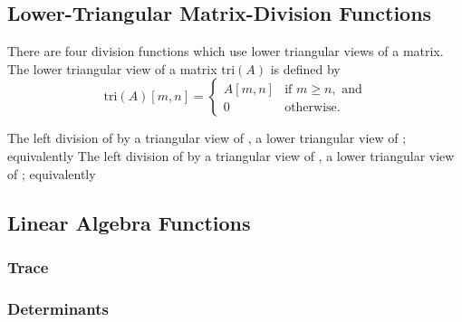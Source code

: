 \subsection{Lower-Triangular Matrix-Division Functions}

There are four division functions which use lower triangular views of
a matrix.  The lower triangular view of a matrix $\mbox{tri}(A)$ is defined by
\[
\mbox{tri}(A)[m,n] = 
\left\{
\begin{array}{ll}
A[m,n] & \mbox{if } m \geq n, \mbox{ and}
\\[4pt]
0 & \mbox{otherwise}.
\end{array}
\right.
\]


\begin{description}
%
%
%
%
The left division of  by a triangular view of
, a lower triangular view of ; equivalently
%
The left division of  by a triangular view of
, a lower triangular view of ; equivalently
%
\end{description}


\subsection{Linear Algebra Functions}

\subsubsection{Trace}

\begin{description}
%
%
\end{description}

\subsubsection{Determinants}

